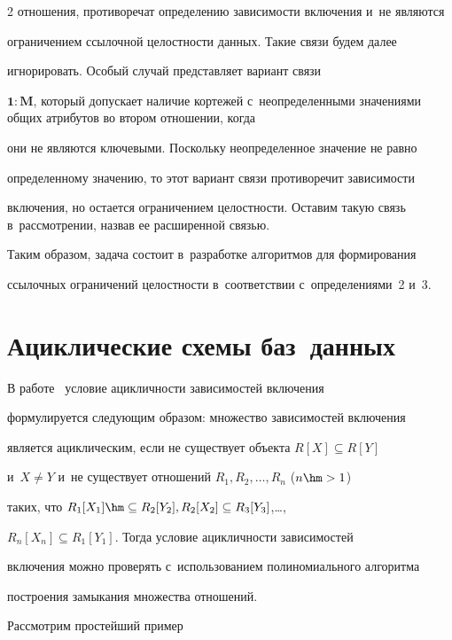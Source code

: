 \begin{multicols}{2}
отношения, противоречат определению зависимости включения и~не являются

ограничением ссылочной целостности данных. Такие связи будем далее

игнорировать. Особый случай представляет вариант связи

$\mathbf{1}:\mathbf{M}$, который допускает наличие кортежей с~неопределенными значениями общих атрибутов во втором отношении, когда

они не являются ключевыми. Поскольку неопределенное значение не равно

определенному значению, то этот вариант связи противоречит зависимости

включения, но остается ограничением целостности. Оставим такую связь в~рассмотрении, назвав ее расширенной связью.



  Таким образом, задача состоит в~разработке алгоритмов для формирования

ссылочных ограничений целостности в~соответствии с~определениями~2 и~3.



\vspace*{-6pt}





\section{Ациклические схемы баз~данных}



  В работе~\cite{6-z} условие ацикличности зависимостей включения

формулируется следующим образом: множество зависимостей включения

является ациклическим, если не существует объекта $R[X]\subseteq R[Y]$

и~$X\not= Y$ и~не существует отношений $R_1, R_2, \ldots, R_n$ ($n\hm>1$)

таких, что $R_1[X_1]\hm\subseteq R_2[Y_2], R_2[X_2]\subseteq R_3[Y_3]$,\ldots ,

$R_n[X_n]\subseteq R_1[Y_1]$. Тогда условие ацикличности зависимостей

включения можно проверять с~использованием полиномиального алгоритма

построения замыкания множества отношений. 



Рассмотрим простейший пример


\end{multicols}
